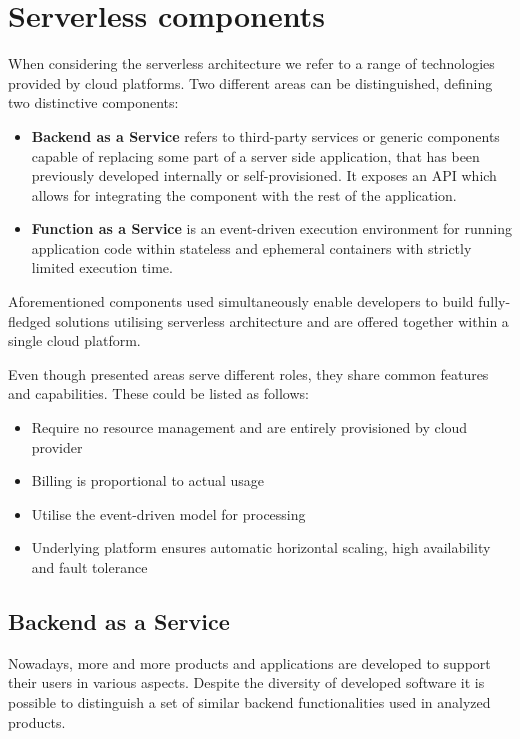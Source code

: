 \section{Serverless components}

When considering the serverless architecture we refer to a range of technologies provided by cloud platforms. Two different areas can be distinguished, defining two distinctive components:

\begin{itemize}
    \item \textbf{Backend as a Service} refers to third-party services or generic components capable of replacing some part of a server side application, that has been previously developed internally or self-provisioned. It exposes an API which allows for integrating the component with the rest of the application.
    \item \textbf{Function as a Service} is an event-driven execution environment for running application code within stateless and ephemeral containers with strictly limited execution time.
\end{itemize}

Aforementioned components used simultaneously enable developers to build fully-fledged solutions utilising serverless architecture and are offered together within a single cloud platform.

Even though presented areas serve different roles, they share common features and capabilities. These could be listed as follows:

\begin{itemize}
    \item Require no resource management and are entirely provisioned by cloud provider
    \item Billing is proportional to actual usage
    \item Utilise the event-driven model for processing
    \item Underlying platform ensures automatic horizontal scaling, high availability and fault tolerance
\end{itemize}

\subsection{Backend as a Service}

Nowadays, more and more products and applications are developed to support their users in various aspects. Despite the diversity of developed software it is possible to distinguish a set of similar backend functionalities used in analyzed products.

